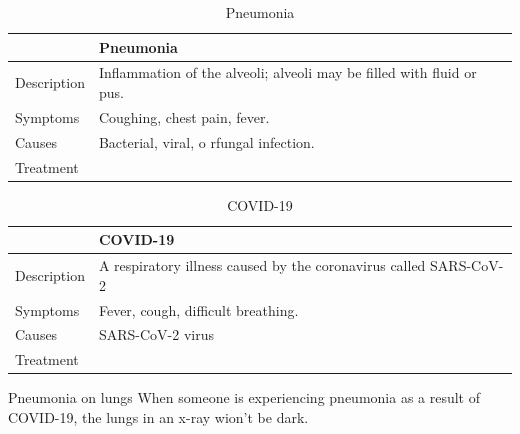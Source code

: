 \documentclass[12pt]{report}
\begin{document}
\begin{table}[h!]
    \renewcommand{\arraystretch}{1.5}
    \setlength{\tabcolsep}{10pt}
    \setlength{\arrayrulewidth}{0.25mm}

    \begin{center}
        \vspace{0.5em}
        \begin{tabular}{|l|p{}|}
        \hline
         & Pneumonia \\ 
        \hline
        Description & Inflammation of the alveoli; alveoli may be filled with fluid or pus. \\
        \hline
        Symptoms & Coughing, chest pain, fever.\\ 
        \hline 
        Causes & Bacterial, viral, o rfungal infection.\\ 
        \hline 
        Treatment & \\
        \hline
        \end{tabular}
    \end{center}
    \caption{Pneumonia}
\end{table}

\begin{table}[h!]
    \renewcommand{\arraystretch}{1.5}
    \setlength{\tabcolsep}{10pt}
    \setlength{\arrayrulewidth}{0.25mm}

    \begin{center}
        \vspace{0.5em}
        \begin{tabular}{|l|p{}|}
        \hline
         & COVID-19 \\ 
        \hline
        Description & A respiratory illness caused by the coronavirus called SARS-CoV-2 \\
        \hline
        Symptoms & Fever, cough, difficult breathing.\\ 
        \hline 
        Causes & SARS-CoV-2 virus\\ 
        \hline 
        Treatment & \\ 
        \hline
        \end{tabular}
    \end{center}
    \caption{COVID-19}
\end{table}

\begin{note}{Pneumonia on lungs}
When someone is experiencing pneumonia as a result of COVID-19, the lungs in an x-ray wion't be dark.
\end{note}
\end{document}
